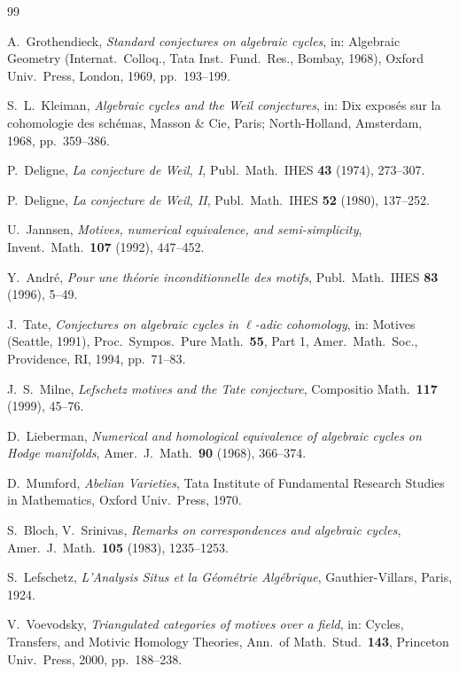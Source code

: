 \documentclass[12pt,a4paper]{amsart}
\theoremstyle{definition}
\begin{document}
\begin{thebibliography}{99}

A.\ Grothendieck,
\textit{Standard conjectures on algebraic cycles},
in: Algebraic Geometry (Internat.\ Colloq., Tata Inst.\ Fund.\ Res., Bombay, 1968),
Oxford Univ.\ Press, London, 1969, pp.\ 193--199.

S.\ L.\ Kleiman,
\textit{Algebraic cycles and the Weil conjectures},
in: Dix expos\'es sur la cohomologie des sch\'emas, Masson \& Cie, Paris; North-Holland, Amsterdam, 1968, pp.\ 359--386.

P.\ Deligne,
\textit{La conjecture de Weil, I},
Publ.\ Math.\ IHES \textbf{43} (1974), 273--307.

P.\ Deligne,
\textit{La conjecture de Weil, II},
Publ.\ Math.\ IHES \textbf{52} (1980), 137--252.

U.\ Jannsen,
\textit{Motives, numerical equivalence, and semi-simplicity},
Invent.\ Math.\ \textbf{107} (1992), 447--452.

Y.\ Andr\'e,
\textit{Pour une th\'eorie inconditionnelle des motifs},
Publ.\ Math.\ IHES \textbf{83} (1996), 5--49.

J.\ Tate,
\textit{Conjectures on algebraic cycles in $\ell$-adic cohomology},
in: Motives (Seattle, 1991), Proc.\ Sympos.\ Pure Math.\ \textbf{55}, Part 1,
Amer.\ Math.\ Soc., Providence, RI, 1994, pp.\ 71--83.

J.\ S.\ Milne,
\textit{Lefschetz motives and the Tate conjecture},
Compositio Math.\ \textbf{117} (1999), 45--76.

D.\ Lieberman,
\textit{Numerical and homological equivalence of algebraic cycles on Hodge manifolds},
Amer.\ J.\ Math.\ \textbf{90} (1968), 366--374.

D.\ Mumford,
\textit{Abelian Varieties},
Tata Institute of Fundamental Research Studies in Mathematics, Oxford Univ.\ Press, 1970.

S.\ Bloch, V.\ Srinivas,
\textit{Remarks on correspondences and algebraic cycles},
Amer.\ J.\ Math.\ \textbf{105} (1983), 1235--1253.

S.\ Lefschetz,
\textit{L'Analysis Situs et la G\'eom\'etrie Alg\'ebrique},
Gauthier-Villars, Paris, 1924.

V.\ Voevodsky,
\textit{Triangulated categories of motives over a field},
in: Cycles, Transfers, and Motivic Homology Theories,
Ann.\ of Math.\ Stud.\ \textbf{143}, Princeton Univ.\ Press, 2000, pp.\ 188--238.


\end{thebibliography}
\end{document}
